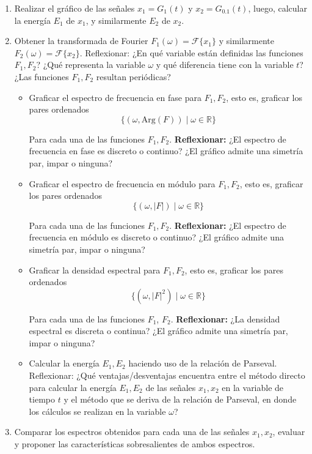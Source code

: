 \documentclass[12pt,a4paper]{report}
\begin{document}
\begin{enumerate}[label=\alph*)]
  \item Realizar el gráfico de las señales $x_1 = G_1(t)$ y $x_2 = G_{0.1}(t)$, luego, calcular la energía $E_1$ de 
    $x_1$, y similarmente $E_2$ de $x_2$.

  \item Obtener la transformada de Fourier $F_1(\omega) = \mathcal{F}\{x_1\}$ y similarmente $F_2(\omega) = 
    \mathcal{F}\{x_2\}$. Reflexionar: ¿En qué variable están definidas las funciones $F_1, F_2$? 
    ¿Qué representa la variable $\omega$ y qué diferencia tiene con la variable $t$? 
    ¿Las funciones $F_1, F_2$ resultan periódicas?
  
  \begin {itemize}
    \item Graficar el espectro de frecuencia en fase para $F_1, F_2$, esto es, graficar los pares ordenados
    $$\{(\omega, \text{Arg}(F)) \mid \omega \in \mathbb{R}\}$$

    Para cada una de las funciones $F_1, F_2$.\newline
    \textbf{Reflexionar:} ¿El espectro de frecuencia en fase es discreto o continuo? ¿El gráfico admite una simetría
    par, impar o ninguna?
    \item Graficar el espectro de frecuencia en módulo para $F_1, F_2$, esto es, graficar los pares ordenados
    $$\{(\omega, |F|) \mid \omega \in \mathbb{R}\}$$

    Para cada una de las funciones $F_1, F_2$.\newline
    \textbf{Reflexionar:} ¿El espectro de frecuencia en módulo es discreto o continuo? ¿El gráfico admite una 
    simetría par, impar o ninguna?
    \item Graficar la densidad espectral para $F_1, F_2$, esto es, graficar los pares ordenados
    $$\{(\omega, |F|^2) \mid \omega \in \mathbb{R}\}$$

    Para cada una de las funciones $F_1$, $F_2$.\newline
    \textbf{Reflexionar:} ¿La densidad espectral es discreta o continua? ¿El gráfico admite una simetría par, impar o
    ninguna?

    \item Calcular la energía $E_1, E_2$ haciendo uso de la relación de Parseval.
    Reflexionar: ¿Qué ventajas/desventajas encuentra entre el método directo para calcular la energía $E_1, E_2$ de
    las señales $x_1, x_2$ en la variable de tiempo $t$ y el método que se deriva de la relación de Parseval, en
    donde los cálculos se realizan en la variable $\omega$?

  \end{itemize}

  \item Comparar los espectros obtenidos para cada una de las señales $x_1, x_2$, evaluar y proponer las 
    características sobresalientes de ambos espectros.

\end{enumerate}
\end{document}
